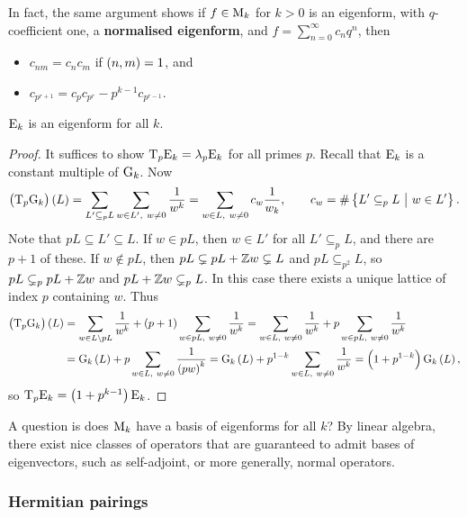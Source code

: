 In fact, the same argument shows if $ f \in \mathrm{M}_k $ for $ k > 0 $ is an eigenform, with $ q $-coefficient one, a \textbf{normalised eigenform}, and $ f = \sum_{n = 0}^\infty c_nq^n $, then
\begin{itemize}
\item $ c_{nm} = c_nc_m $ if $ \br{n, m} = 1 $, and
\item $ c_{p^{r + 1}} = c_pc_{p^r} - p^{k - 1}c_{p^{r - 1}} $.
\end{itemize}

\begin{proposition}
$ \mathrm{E}_k $ is an eigenform for all $ k $.
\end{proposition}

\begin{proof}
It suffices to show $ \mathrm{T}_p\mathrm{E}_k = \lambda_p\mathrm{E}_k $ for all primes $ p $. Recall that $ \mathrm{E}_k $ is a constant multiple of $ \mathrm{G}_k $. Now
$$ \br{\T_p\G_k}\br{L} = \sum_{L' \subseteq_p L} \sum_{w \in L', \ w \ne 0} \dfrac{1}{w^k} = \sum_{w \in L, \ w \ne 0} c_w\dfrac{1}{w_k}, \qquad c_w = \#\cbr{L' \subseteq_p L \st w \in L'}. $$
Note that $ pL \subseteq L' \subseteq L $. If $ w \in pL $, then $ w \in L' $ for all $ L' \subseteq_p L $, and there are $ p + 1 $ of these. If $ w \notin pL $, then $ pL \subsetneq pL + \mathbb{Z} w \subsetneq L $ and $ pL \subseteq_{p^2} L $, so $ pL \subsetneq_p pL + \mathbb{Z} w $ and $ pL + \mathbb{Z} w \subsetneq_p L $. In this case there exists a unique lattice of index $ p $ containing $ w $. Thus
\begin{align*}
\br{\T_p\G_k}\br{L}
& = \sum_{w \in L \setminus pL} \dfrac{1}{w^k} + \br{p + 1}\sum_{w \in pL, \ w \ne 0} \dfrac{1}{w^k}
= \sum_{w \in L, \ w \ne 0} \dfrac{1}{w^k} + p\sum_{w \in pL, \ w \ne 0} \dfrac{1}{w^k} \\
& = \G_k\br{L} + p\sum_{w \in L, \ w \ne 0} \dfrac{1}{\br{pw}^k}
= \G_k\br{L} + p^{1 - k}\sum_{w \in L, \ w \ne 0} \dfrac{1}{w^k}
= \br{1 + p^{1 - k}}\G_k\br{L},
\end{align*}
so $ \T_p\E_k = \br{1 + p^{k - 1}}\E_k $.
\end{proof}

\pagebreak

A question is does $ \mathrm{M}_k $ have a basis of eigenforms for all $ k $? By linear algebra, there exist nice classes of operators that are guaranteed to admit bases of eigenvectors, such as self-adjoint, or more generally, normal operators.

\subsubsection{Hermitian pairings}

